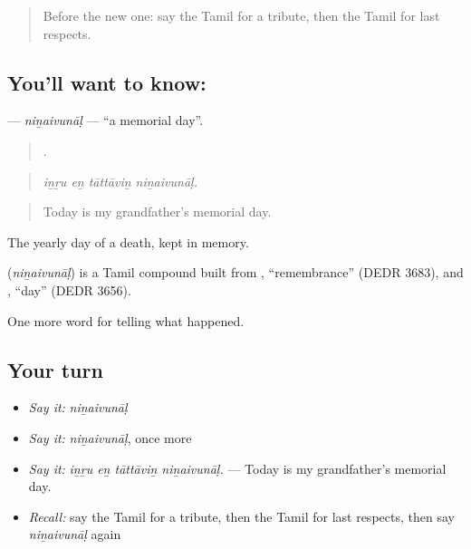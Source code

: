 \label{lesson:TA-C324-ninaivunal}



\begin{quote}
Before the new one: say the Tamil for a tribute, then the Tamil for last respects.
\end{quote}

\subsection*{You'll want to know: }
\textbf{} — \emph{niṉaivunāḷ} — \textquotedblleft{}a memorial day\textquotedblright{}.

\begin{quote}
   .
\end{quote}

\begin{quote}
\emph{iṉṟu eṉ tāttāviṉ niṉaivunāḷ.}
\end{quote}

\begin{quote}
Today is my grandfather's memorial day.
\end{quote}

The yearly day of a death, kept in memory.

\begin{cousinweb}
\textbf{} (\emph{niṉaivunāḷ}) is a Tamil compound built from , \textquotedblleft{}remembrance\textquotedblright{} (DEDR 3683), and , \textquotedblleft{}day\textquotedblright{} (DEDR 3656).
\end{cousinweb}

\begin{grammarlens}[title={What you've built}]
One more word for telling what happened.
\end{grammarlens}

\subsection*{Your turn}
\begin{itemize}
\raggedright
  \item \emph{Say it:} \emph{niṉaivunāḷ}
  \item \emph{Say it:} \emph{niṉaivunāḷ}, once more
  \item \emph{Say it:} \emph{iṉṟu eṉ tāttāviṉ niṉaivunāḷ.} — Today is my grandfather's memorial day.
  \item \emph{Recall:} say the Tamil for a tribute, then the Tamil for last respects, then say \emph{niṉaivunāḷ} again
\end{itemize}

